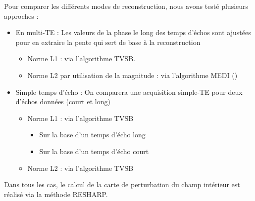 {Pour comparer les différents modes de reconstruction, nous avons testé plusieurs approches :
\begin{itemize}
	\item En multi-TE : Les valeurs de la phase le long des temps d’échos sont ajustées pour en extraire
	la pente qui sert de base à la reconstruction
	\begin{itemize}
		\item Norme L1 : via l’algorithme TVSB.
		\item Norme L2 par utilisation de la magnitude : via l’algorithme MEDI (\cite{Liu2011b})
	\end{itemize}
	\item Simple temps d’écho : On comparera une acquisition simple-TE pour deux d’échos données
	(court et long)
	\begin{itemize}
		\item Norme L1 : via l’algorithme TVSB
		\begin{itemize}
			\item Sur la base d’un temps d’écho long
			\item Sur la base d’un temps d’écho court
		\end{itemize}
	\item Norme L2 : via l’algorithme TVSB
	\end{itemize}
\end{itemize}
Dans tous les cas, le calcul de la carte de perturbation du champ intérieur est réalisé via la
méthode RESHARP.

}
